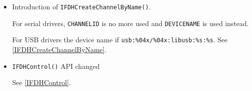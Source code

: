 \documentclass[a4paper,12pt]{article}
\begin{document}
\begin{itemize}
\item Introduction of \texttt{IFDHCreateChannelByName()}.

For serial drivers, \texttt{CHANNELID} is no more used and
\texttt{DEVICENAME} is used instead.

For USB drivers the device name if \verb+usb:%04x/%04x:libusb:%s:%s+.
See \ref{IFDHCreateChannelByName}.

\item \texttt{IFDHControl()} API changed

See \ref{IFDHControl}.

\end{itemize}




\end{document}
